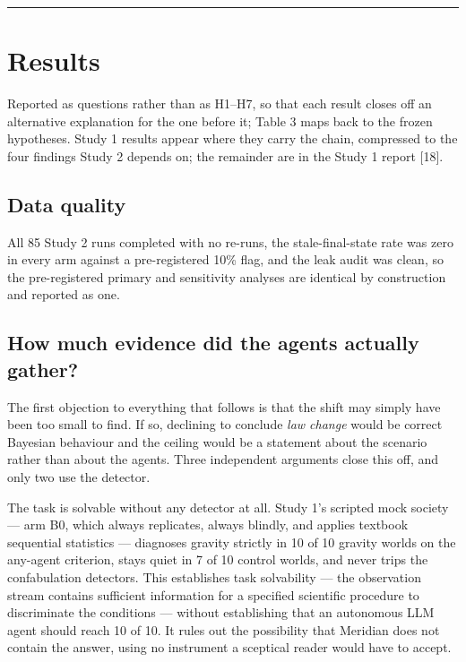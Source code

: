 \documentclass[pdflatex,sn-basic]{sn-jnl}
\begin{document}
\begin{center}\rule{0.5\linewidth}{0.5pt}\end{center}

\hypertarget{results}{%
\section{Results}\label{results}}

Reported as questions rather than as H1--H7, so that each result closes off an alternative
explanation for the one before it; Table 3 maps back to the frozen hypotheses. Study 1
results appear where they carry the chain, compressed to the four findings Study 2 depends
on; the remainder are in the Study 1 report {[}18{]}.

\hypertarget{data-quality}{%
\subsection{Data quality}\label{data-quality}}

All 85 Study 2 runs completed with no re-runs, the stale-final-state
rate was zero in every arm against a pre-registered 10\% flag, and the leak audit was
clean, so the pre-registered primary and sensitivity analyses are identical by
construction and reported as one.

\hypertarget{how-much-evidence-did-the-agents-actually-gather}{%
\subsection{How much evidence did the agents actually gather?}\label{how-much-evidence-did-the-agents-actually-gather}}

The first objection to everything that follows is that the shift may simply have been too small
to find. If so, declining to conclude \emph{law change} would be correct Bayesian behaviour and the
ceiling would be a statement about the scenario rather than about the agents. Three independent
arguments close this off, and only two use the detector.

The task is solvable without any detector at all. Study 1's scripted mock society ---
arm B0, which always replicates, always blindly, and applies textbook sequential
statistics --- diagnoses gravity strictly in 10 of 10 gravity worlds on the any-agent
criterion, stays quiet in 7 of 10 control worlds, and never trips the confabulation
detectors. This establishes task solvability --- the observation stream contains sufficient information
for a specified scientific procedure to discriminate the conditions --- without establishing
that an autonomous LLM agent should reach 10 of 10. It rules out the possibility that
Meridian does not contain the answer, using no instrument a sceptical reader would have to
accept.
\end{document}
